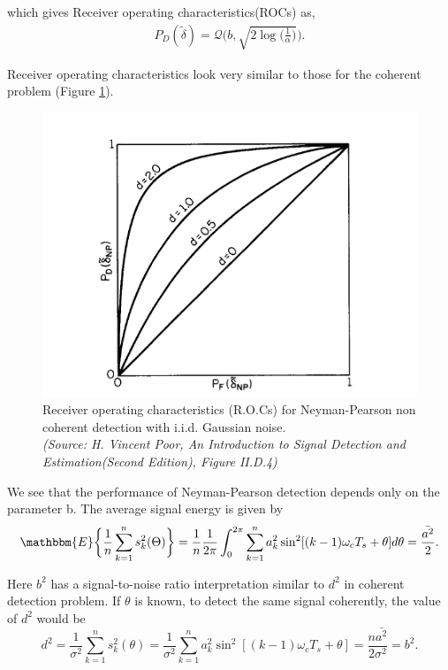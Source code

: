 \documentclass[a4paper,english,12pt]{article}
\begin{document}
which gives Receiver operating characteristics(ROCs) as,
\begin{equation*}
\begin{aligned}
P_D(\tilde{\delta})=\mathcal{Q}\bigg(b,\sqrt{2\log\bigg(\frac{1}{\alpha}\bigg)}\bigg).
\end{aligned}
\end{equation*}
 \par Receiver operating characteristics look very similar to those for the coherent problem (Figure \ref{fn2}). 
\begin{figure}[hbtp]
	\centering
	\includegraphics[scale=0.75]{Figures/VP_II_D_4.png}
	\caption{Receiver operating characteristics (R.O.Cs) for Neyman-Pearson non coherent detection with i.i.d. Gaussian noise.  \\ \textit{(Source: H. Vincent Poor, An Introduction to Signal Detection and Estimation(Second
			Edition), Figure II.D.4)}}
	\label{fn2}
\end{figure}
We see that the performance of Neyman-Pearson detection depends only on the parameter b. The average signal energy is given by
\begin{equation}
 \label{n19}
\mathbbm{E}\bigg\{\frac{1}{n}\sum_{k=1}^{n}s_k^2(\Theta) \bigg\}=\frac{1}{n}\frac{1}{2\pi}\int_{0}^{2\pi}\sum_{k=1}^{n}a_k^2\sin^2[(k-1)\omega_cT_s+\theta]d\theta = \frac{\bar{a^2}}{2}.
\end{equation} 
\par Here $b^2$ has a signal-to-noise ratio interpretation similar to $d^2$ in coherent detection problem. If $\theta$ is known, to detect the same signal coherently, the value of $d^2$ would be
\begin{equation}
 \label{n20}
d^2=\frac{1}{\sigma^2}\sum_{k=1}^{n}s_k^2(\theta)=\frac{1}{\sigma^2}\sum_{k=1}^{n}a_k^2\sin^2[(k-1)\omega_c T_s+\theta]=\frac{n\bar{a^2}}{2\sigma^2}=b^2.
\end{equation}
\end{document}
